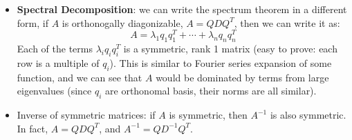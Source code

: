 \documentclass{report}
\begin{document}
\begin{itemize}
\item \textbf{Spectral Decomposition}: we can write the spectrum theorem in a different form, if $A$ is orthonogally diagonizable, $A = Q D Q^T$, then we can write it as:
\begin{equation}
A = \lambda_1 q_1 q_1^T + \cdots + \lambda_n q_n q_n^T
\end{equation}
Each of the terms $\lambda_i q_i q_i^T$ is a symmetric, rank 1 matrix (easy to prove: each row is a multiple of $q_i$). This is similar to Fourier series expansion of some function, and we can see that $A$ would be dominated by terms from large eigenvalues (since $q_i$ are orthonomal basis, their norms are all similar). 

\item Inverse of symmetric matrices: if $A$ is symmetric, then $A^{-1}$ is also symmetric. In fact, $A = Q D Q^T$, and $A^{-1} = Q D^{-1} Q^T$. 
\end{itemize}
\end{document}
